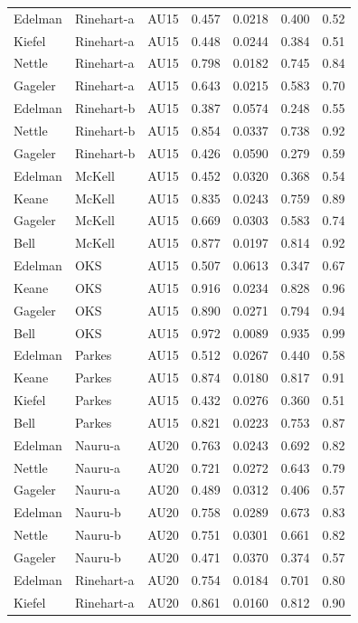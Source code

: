 \documentclass{monashthesis}
\begin{document}
\begin{center}
\begin{longtable}{lllllll}
Edelman & Rinehart-a & AU15 & 0.457 & 0.0218 & 0.400 & 0.52 \\
Kiefel & Rinehart-a & AU15 & 0.448 & 0.0244 & 0.384 & 0.51 \\
Nettle & Rinehart-a & AU15 & 0.798 & 0.0182 & 0.745 & 0.84 \\
Gageler & Rinehart-a & AU15 & 0.643 & 0.0215 & 0.583 & 0.70 \\
Edelman & Rinehart-b & AU15 & 0.387 & 0.0574 & 0.248 & 0.55 \\
Nettle & Rinehart-b & AU15 & 0.854 & 0.0337 & 0.738 & 0.92 \\
Gageler & Rinehart-b & AU15 & 0.426 & 0.0590 & 0.279 & 0.59 \\
Edelman & McKell & AU15 & 0.452 & 0.0320 & 0.368 & 0.54 \\
Keane & McKell & AU15 & 0.835 & 0.0243 & 0.759 & 0.89 \\
Gageler & McKell & AU15 & 0.669 & 0.0303 & 0.583 & 0.74 \\
Bell & McKell & AU15 & 0.877 & 0.0197 & 0.814 & 0.92 \\
Edelman & OKS & AU15 & 0.507 & 0.0613 & 0.347 & 0.67 \\
Keane & OKS & AU15 & 0.916 & 0.0234 & 0.828 & 0.96 \\
Gageler & OKS & AU15 & 0.890 & 0.0271 & 0.794 & 0.94 \\
Bell & OKS & AU15 & 0.972 & 0.0089 & 0.935 & 0.99 \\
Edelman & Parkes & AU15 & 0.512 & 0.0267 & 0.440 & 0.58 \\
Keane & Parkes & AU15 & 0.874 & 0.0180 & 0.817 & 0.91 \\
Kiefel & Parkes & AU15 & 0.432 & 0.0276 & 0.360 & 0.51 \\
Bell & Parkes & AU15 & 0.821 & 0.0223 & 0.753 & 0.87 \\
Edelman & Nauru-a & AU20 & 0.763 & 0.0243 & 0.692 & 0.82 \\
Nettle & Nauru-a & AU20 & 0.721 & 0.0272 & 0.643 & 0.79 \\
Gageler & Nauru-a & AU20 & 0.489 & 0.0312 & 0.406 & 0.57 \\
Edelman & Nauru-b & AU20 & 0.758 & 0.0289 & 0.673 & 0.83 \\
Nettle & Nauru-b & AU20 & 0.751 & 0.0301 & 0.661 & 0.82 \\
Gageler & Nauru-b & AU20 & 0.471 & 0.0370 & 0.374 & 0.57 \\
Edelman & Rinehart-a & AU20 & 0.754 & 0.0184 & 0.701 & 0.80 \\
Kiefel & Rinehart-a & AU20 & 0.861 & 0.0160 & 0.812 & 0.90 \\

\end{longtable}
\end{center}
\end{document}
